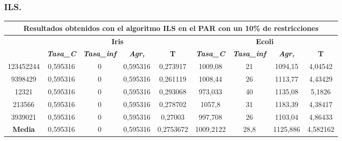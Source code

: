 \documentclass[12pt, spanish]{article}
\begin{document}
\subsubsection{ILS.}


\begin{table}[H]
\begin{tabular}{|c|c|c|c|c|c|c|c|c|}
\hline
\multicolumn{9}{|c|}{\textbf{Resultados obtenidos con el algoritmo ILS en el PAR con un 10\% de restricciones}}                                                                                                   \\ \hline
\multirow{2}{*}{} & \multicolumn{4}{c|}{\textbf{Iris}}                                                            & \multicolumn{4}{c|}{\textbf{Ecoli}}                                                           \\ \cline{2-9} 
                  & \textit{\textbf{Tasa\_C}} & \textit{\textbf{Tasa\_inf}} & \textit{\textbf{Agr,}} & \textbf{T} & \textit{\textbf{Tasa\_C}} & \textit{\textbf{Tasa\_inf}} & \textit{\textbf{Agr,}} & \textbf{T} \\ \hline
123452244         & 0,595316                  & 0                           & 0,595316               & 0,273917   & 1009,08                   & 21                          & 1094,15                & 4,04542    \\ \hline
9398429           & 0,595316                  & 0                           & 0,595316               & 0,261119   & 1008,44                   & 26                          & 1113,77                & 4,43429    \\ \hline
12321             & 0,595316                  & 0                           & 0,595316               & 0,293068   & 973,033                   & 40                          & 1135,08                & 5,1826     \\ \hline
213566            & 0,595316                  & 0                           & 0,595316               & 0,278702   & 1057,8                    & 31                          & 1183,39                & 4,38417    \\ \hline
3939021           & 0,595316                  & 0                           & 0,595316               & 0,27003    & 997,708                   & 26                          & 1103,04                & 4,86433    \\ \hline
\textbf{Media}    & 0,595316                  & 0                           & 0,595316               & 0,2753672  & 1009,2122                 & 28,8                        & 1125,886               & 4,582162   \\ \hline
\end{tabular}
\end{table}
\end{document}
